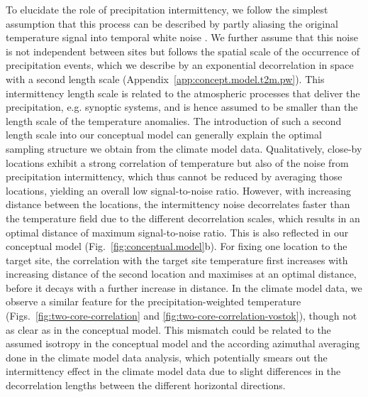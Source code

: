 \documentclass[cp, manuscript]{copernicus}
\begin{document}
To elucidate the role of precipitation intermittency, we follow the simplest
assumption that this process can be described by partly aliasing the original
temperature signal into temporal white noise \citep{Laepple2018,Casado2019}. We
further assume that this noise is not independent between sites but follows the
spatial scale of the occurrence of precipitation events, which we describe by an
exponential decorrelation in space with a second length scale
(Appendix~\ref{app:concept.model.t2m.pw}). This intermittency length scale is
related to the atmospheric processes that deliver the precipitation,
e.g. synoptic systems, and is hence assumed to be smaller than the length scale
of the temperature anomalies. The introduction of such a second length scale
into our conceptual model can generally explain the optimal sampling structure
we obtain from the climate model data. Qualitatively, close-by locations exhibit
a strong correlation of temperature but also of the noise from precipitation
intermittency, which thus cannot be reduced by averaging those locations,
yielding an overall low signal-to-noise ratio. However, with increasing distance
between the locations, the intermittency noise decorrelates faster than the
temperature field due to the different decorrelation scales, which results in an
optimal distance of maximum signal-to-noise ratio. This is also reflected in our
conceptual model (Fig.~\ref{fig:conceptual.model}b). For fixing one location to
the target site, the correlation with the target site temperature first
increases with increasing distance of the second location and maximises at an
optimal distance, before it decays with a further increase in distance. In the
climate model data, we observe a similar feature for the precipitation-weighted
temperature (Figs.~\ref{fig:two-core-correlation} and
\ref{fig:two-core-correlation-vostok}), though not as clear as in the conceptual
model. This mismatch could be related to the assumed isotropy in the conceptual
model and the according azimuthal averaging done in the climate model data
analysis, which potentially smears out the intermittency effect in the climate
model data due to slight differences in the decorrelation lengths between the
different horizontal directions.
\end{document}
